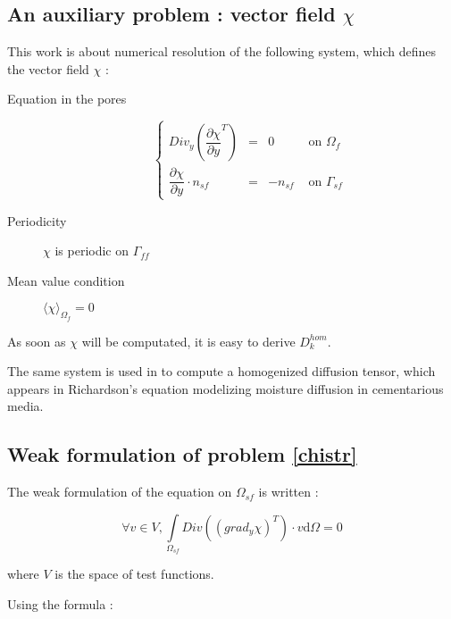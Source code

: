 \subsection{An auxiliary problem : vector field $\chi$}

This work is about numerical resolution of the following system, which defines the vector field $\chi$ :

\begin{description}
\item[Equation in the pores] 
\begin{equation}\label{chistr}
\left\{%
\begin{array}{lccr}
Div_y \left( \dfrac{\partial{\chi}}{\partial{y}}^T\right) &=& 0&\text{ on }\Omega_f \\
\dfrac{\partial{\chi}}{\partial{y}} \cdot n_{sf}&=&-n_{sf}&\text{ on }\Gamma_{sf}
\end{array}
\right.
\end{equation}
\item[Periodicity] $\chi$ is periodic on $\Gamma_{ff}$
\item[Mean value condition] $\langle\chi\rangle_{\Omega_f}=0$
\end{description}

As soon as $\chi$ will be computated, it is easy to derive $D_k^{hom}$.

\ligneinter
The same system is used in \cite{WalMill16} to compute a homogenized diffusion tensor, %
which appears in Richardson's equation modelizing moisture diffusion in cementarious media.

\subsection{Weak formulation of problem \ref{chistr}}

The weak formulation of the equation on $\Omega_{sf}$ is written :

\[\forall v \in V , \int\limits_{\Omega_{sf}}Div\left(\left(grad_y \chi\right)^{T}\right)\cdot v\text{d}\Omega=0\]

where $V$ is the space of test functions.

\par
Using the formula :

